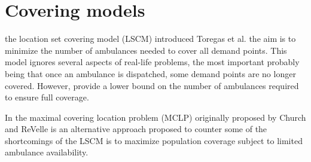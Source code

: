 \section{Covering models}
the location set covering model (LSCM)
introduced Toregas et al. \cite{toregas1971location}
the aim
is to minimize
the number of ambulances needed
to cover all demand points.
This model
ignores several aspects of real-life problems,
the most important
probably being that
once an ambulance is dispatched,
some demand points
are no longer covered.
However,
provide
a lower bound
on the number of ambulances
required to ensure full coverage.

In the maximal covering location problem (MCLP)
originally proposed by Church and ReVelle \cite{church1974maximal}
is an alternative approach
proposed to counter some of the shortcomings of the LSCM
is to maximize population coverage
subject to limited ambulance availability.
